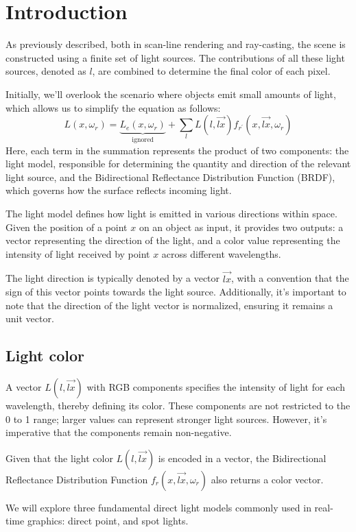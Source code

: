\section{Introduction}

As previously described, both in scan-line rendering and ray-casting, the scene is constructed using a finite set of light sources. 
The contributions of all these light sources, denoted as $l$, are combined to determine the final color of each pixel.

Initially, we'll overlook the scenario where objects emit small amounts of light, which allows us to simplify the equation as follows:
\[L(x,\omega_r)=\underbrace{L_e(x,\omega_r)}_{\text{ignored}} +\sum_{l}L(l,\overrightarrow{lx})f_{r^\prime}(x,\overrightarrow{lx},\omega_r) \]
Here, each term in the summation represents the product of two components: the light model, responsible for determining the quantity and direction of the relevant light source, and the Bidirectional Reflectance Distribution Function (BRDF), which governs how the surface reflects incoming light.

The light model defines how light is emitted in various directions within space. 
Given the position of a point $x$ on an object as input, it provides two outputs: a vector representing the direction of the light, and a color value representing the intensity of light received by point $x$ across different wavelengths.

The light direction is typically denoted by a vector $\overrightarrow{lx}$, with a convention that the sign of this vector points towards the light source.
Additionally, it's important to note that the direction of the light vector is normalized, ensuring it remains a unit vector.

\subsection{Light color}
A vector $L(l,\overrightarrow{lx})$ with RGB components specifies the intensity of light for each wavelength, thereby defining its color.
These components are not restricted to the 0 to 1 range; larger values can represent stronger light sources. 
However, it's imperative that the components remain non-negative.

Given that the light color $L(l,\overrightarrow{lx})$ is encoded in a vector, the Bidirectional Reflectance Distribution Function $f_{r}(x,\overrightarrow{lx},\omega_r)$ also returns a color vector.

We will explore three fundamental direct light models commonly used in real-time graphics: direct point, and spot lights. 